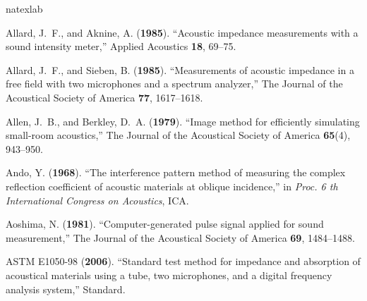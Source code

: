 \documentclass[reprint]{JASA}
\begin{document}
\begin{thebibliography}{80}
	\def\enquote#1{``#1,''}
	\def\plainquote#1{``#1''}
	\expandafter\ifx\csname natexlab\endcsname\relax\def\natexlab#1{#1}\fi
	\providecommand{\dourl}[1]{\href{http://#1}{\nolinkurl{#1}}}
	\providecommand{\bibinfo}[2]{#2}
	\providecommand{\noopsort}[1]{}
	\providecommand{\switchargs}[2]{#2#1}
	\def\eatspace #1{#1}
	
	\bibinfo{author}{Allard, J.~F.},  and \bibinfo{author}{Aknine, A.}
	(\textbf{\bibinfo{year}{1985}}). \enquote{\bibinfo{title}{Acoustic impedance
			measurements with a sound intensity meter}} \bibinfo{journal}{Applied
		Acoustics} \textbf{18}, \bibinfo{pages}{69--75}.
	
	\bibinfo{author}{Allard, J.~F.},  and \bibinfo{author}{Sieben, B.}
	(\textbf{\bibinfo{year}{1985}}). \enquote{\bibinfo{title}{Measurements of
			acoustic impedance in a free field with two microphones and a spectrum
			analyzer}} \bibinfo{journal}{The Journal of the Acoustical Society of
		America} \textbf{77}, \bibinfo{pages}{1617--1618}.
	
	\bibinfo{author}{Allen, J.~B.},  and \bibinfo{author}{Berkley, D.~A.}
	(\textbf{\bibinfo{year}{1979}}). \enquote{\bibinfo{title}{Image method for
			efficiently simulating small-room acoustics}} \bibinfo{journal}{The Journal
		of the Acoustical Society of America} \textbf{65}(4),
	\bibinfo{pages}{943--950}.
	
	\bibinfo{author}{Ando, Y.} (\textbf{\bibinfo{year}{1968}}).
	\enquote{\bibinfo{title}{The interference pattern method of measuring the
			complex reflection coefficient of acoustic materials at oblique incidence}}
	in \emph{\bibinfo{booktitle}{Proc. 6 th International Congress on
			Acoustics}}, \bibinfo{organization}{ICA}.
	
	\bibinfo{author}{Aoshima, N.} (\textbf{\bibinfo{year}{1981}}).
	\enquote{\bibinfo{title}{Computer-generated pulse signal applied for sound
			measurement}} \bibinfo{journal}{The Journal of the Acoustical Society of
		America} \textbf{69}, \bibinfo{pages}{1484--1488}.
	
	ASTM E1050-98 (\textbf{\bibinfo{year}{2006}}).
	\enquote{\bibinfo{title}{Standard test method for impedance and absorption of
			acoustical materials using a tube, two microphones, and a digital frequency
			analysis system}} \bibinfo{type}{Standard}.
	

\end{thebibliography}
\end{document}
